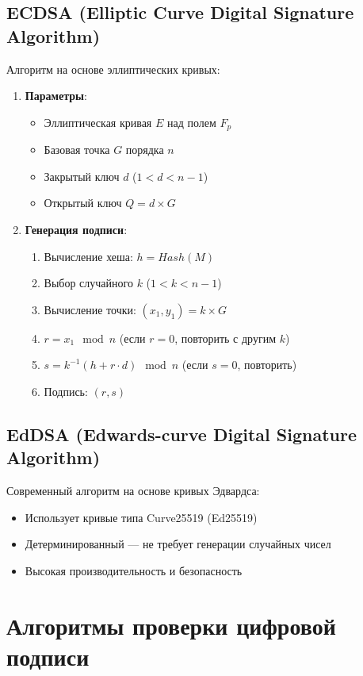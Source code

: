 \subsection*{ECDSA (Elliptic Curve Digital Signature Algorithm)}
Алгоритм на основе эллиптических кривых:
\begin{enumerate}
    \item \textbf{Параметры}: 
    \begin{itemize}
        \item Эллиптическая кривая $E$ над полем $F_p$
        \item Базовая точка $G$ порядка $n$
        \item Закрытый ключ $d$ ($1 < d < n-1$)
        \item Открытый ключ $Q = d \times G$
    \end{itemize}
    
    \item \textbf{Генерация подписи}:
    \begin{enumerate}
        \item Вычисление хеша: $h = Hash(M)$
        \item Выбор случайного $k$ ($1 < k < n-1$)
        \item Вычисление точки: $(x_1, y_1) = k \times G$
        \item $r = x_1 \mod n$ (если $r = 0$, повторить с другим $k$)
        \item $s = k^{-1}(h + r \cdot d) \mod n$ (если $s = 0$, повторить)
        \item Подпись: $(r, s)$
    \end{enumerate}
\end{enumerate}

\subsection*{EdDSA (Edwards-curve Digital Signature Algorithm)}
Современный алгоритм на основе кривых Эдвардса:
\begin{itemize}
    \item Использует кривые типа Curve25519 (Ed25519)
    \item Детерминированный --- не требует генерации случайных чисел
    \item Высокая производительность и безопасность
\end{itemize}




\section{Алгоритмы проверки цифровой подписи}

